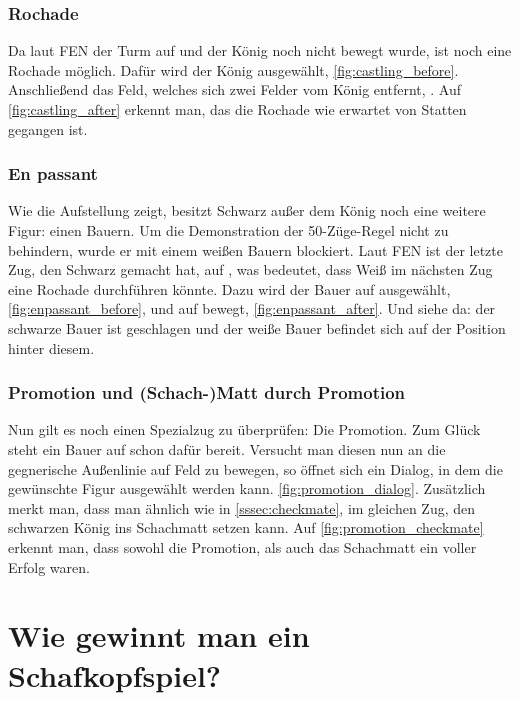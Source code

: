 \subsubsection{Rochade}

Da laut FEN der Turm auf  und der König noch nicht bewegt wurde, ist
noch eine Rochade möglich. Dafür wird der König ausgewählt,
\autoref{fig:castling_before}. Anschließend das Feld, welches sich zwei Felder
vom König entfernt, . Auf \autoref{fig:castling_after} erkennt man, das
die Rochade wie erwartet von Statten gegangen ist.

\subsubsection{En passant}

Wie die Aufstellung zeigt, besitzt Schwarz außer dem König noch eine weitere
Figur: einen Bauern. Um die Demonstration der 50-Züge-Regel nicht zu behindern,
wurde er mit einem weißen Bauern blockiert. Laut FEN ist der letzte Zug, den
Schwarz gemacht hat,  auf , was bedeutet, dass Weiß im
nächsten Zug eine Rochade durchführen könnte. Dazu wird der Bauer auf 
ausgewählt, \autoref{fig:enpassant_before}, und auf  bewegt,
\autoref{fig:enpassant_after}. Und siehe da: der schwarze Bauer ist geschlagen
und der weiße Bauer befindet sich auf der Position hinter diesem.

\subsubsection{Promotion und (Schach-)Matt durch Promotion}

Nun gilt es noch einen Spezialzug zu überprüfen: Die Promotion. Zum Glück steht
ein Bauer auf  schon dafür bereit. Versucht man diesen nun an die
gegnerische Außenlinie auf Feld  zu bewegen, so öffnet sich ein Dialog,
in dem die gewünschte Figur ausgewählt werden kann.
\autoref{fig:promotion_dialog}. Zusätzlich merkt man, dass man ähnlich wie in
\ref{sssec:checkmate}, im gleichen Zug, den schwarzen König ins Schachmatt
setzen kann. Auf \autoref{fig:promotion_checkmate} erkennt man, dass sowohl die
Promotion, als auch das Schachmatt ein voller Erfolg waren.

\section{Wie gewinnt man ein Schafkopfspiel?}
\sectionauthor{\philipp}

